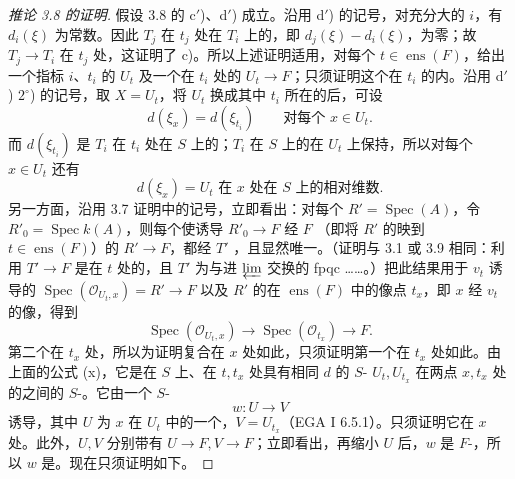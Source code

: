 \begin{proof}[推论 3.8 的证明]
假设 3.8 的 c$'$)、d$'$) 成立。沿用 d$'$) 的记号，对充分大的 $i$，有 $d_i(\xi)$ 为常数。因此 $T_j$ 在 $t_j$ 处在 $T_i$ 上的，即 $d_j(\xi)-d_i(\xi)$，为零；故 $T_j\to T_i$ 在 $t_j$ 处，这证明了 c)。所以上述证明适用，对每个 $t\in\operatorname{ens}(F)$，给出一个指标 $i$、$t_i$ 的 $U_t$ 及一个在 $t_i$ 处的 $U_t\to F$；只须证明这个在 $t_i$ 的内。沿用 d$'$) $2^\circ$) 的记号，取 $X=U_t$，将 $U_t$ 换成其中 $t_i$ 所在的后，可设
\[d(\xi_x)=d(\xi_{t_i})\qquad\text{对每个 }x\in U_t.\]
而 $d(\xi_{t_i})$ 是 $T_i$ 在 $t_i$ 处在 $S$ 上的；$T_i$ 在 $S$ 上的在 $U_t$ 上保持，所以对每个 $x\in U_t$ 还有
\[\tag{*}d(\xi_x)=U_t\text{ 在 }x\text{ 处在 }S\text{ 上的相对维数}.\]
另一方面，沿用 3.7 证明中的记号，立即看出：对每个 $R'=\operatorname{Spec}(A)$，令 $R'_0=\operatorname{Spec}k(A)$，则每个使诱导 $R'_0\to F$ 经 $F$ （即将 $R'$ 的映到 $t\in\operatorname{ens}(F)$）的 $R'\to F$，都经 $T'$ ，且显然唯一。（证明与 3.1 或 3.9 相同：利用 $T'\to F$ 是在 $t$ 处的，且 $T'$ 为与进 $\varprojlim$ 交换的 fpqc ……。）把此结果用于 $v_t$ 诱导的 $\operatorname{Spec}(\mathscr O_{U_t,x})=R'\to F$ 以及 $R'$ 的在 $\operatorname{ens}(F)$ 中的像点 $t_x$，即 $x$ 经 $v_t$ 的像，得到
\[\operatorname{Spec}(\mathscr O_{U_t,x})\longrightarrow\operatorname{Spec}(\mathscr O_{t_x})\longrightarrow F.\]
第二个在 $t_x$ 处，所以为证明复合在 $x$ 处如此，只须证明第一个在 $t_x$ 处如此。由上面的公式 (x)，它是在 $S$ 上、在 $t,t_x$ 处具有相同 $d$ 的 $S$- $U_t,U_{t_x}$ 在两点 $x,t_x$ 处的之间的 $S$-。它由一个 $S$-
\[w:U\longrightarrow V\]
诱导，其中 $U$ 为 $x$ 在 $U_t$ 中的一个，$V=U_{t_x}$（EGA I 6.5.1）。只须证明它在 $x$ 处。此外，$U,V$ 分别带有 $U\to F,V\to F$；立即看出，再缩小 $U$ 后，$w$ 是 $F$-，所以 $w$ 是。现在只须证明如下。
\end{proof}
